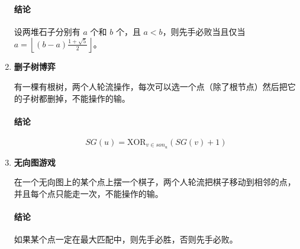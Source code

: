 \begin{enumerate}
\paragraph{结论}设两堆石子分别有 $a$ 个和 $b$ 个，且 $a < b$，则先手必败当且仅当 $a = \left\lfloor (b - a) \frac {1 + \sqrt 5} 2 \right\rfloor$。

\item \textbf{删子树博弈}

有一棵有根树，两个人轮流操作，每次可以选一个点（除了根节点）然后把它的子树都删掉，不能操作的输。

\paragraph{结论}

$$ SG(u) = \text{XOR} _{v \in son_u} \left( SG(v) + 1 \right) $$

\item \textbf{无向图游戏}

在一个无向图上的某个点上摆一个棋子，两个人轮流把棋子移动到相邻的点，并且每个点只能走一次，不能操作的输。

\paragraph{结论} 如果某个点一定在最大匹配中，则先手必胜，否则先手必败。

\end{enumerate}
